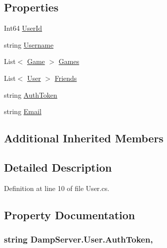 \subsection*{Properties}
\begin{DoxyCompactItemize}
\item 
Int64 \hyperlink{class_damp_server_1_1_user_a96e7806d1b61c328ec1cdb0b98ace8f5}{User\-Id}
\item 
string \hyperlink{class_damp_server_1_1_user_a17c86d74ac30a323864050485b01db83}{Username}
\item 
List$<$ \hyperlink{class_damp_server_1_1_game}{Game} $>$ \hyperlink{class_damp_server_1_1_user_add091c76528355d15a75d6c08d1db2b5}{Games}
\item 
List$<$ \hyperlink{class_damp_server_1_1_user}{User} $>$ \hyperlink{class_damp_server_1_1_user_a73ec7514f54e351940510340479a89d7}{Friends}
\item 
string \hyperlink{class_damp_server_1_1_user_a052957ee17cf64be17abe68e51cee56e}{Auth\-Token}
\item 
string \hyperlink{class_damp_server_1_1_user_ab5bdc989d5254cfa42fd348f6d618642}{Email}
\end{DoxyCompactItemize}
\subsection*{Additional Inherited Members}


\subsection{Detailed Description}


Definition at line 10 of file User.\-cs.



\subsection{Property Documentation}
\hypertarget{class_damp_server_1_1_user_a052957ee17cf64be17abe68e51cee56e}{
\subsubsection[{Auth\-Token}]{\setlength{\rightskip}{0pt plus 5cm}string Damp\-Server.\-User.\-Auth\-Token\hspace{0.3cm}{\ttfamily [get]}, {\ttfamily [set]}}}\label{class_damp_server_1_1_user_a052957ee17cf64be17abe68e51cee56e}


